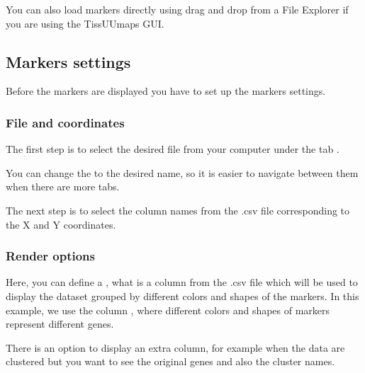 \documentclass[letterpaper,10pt,english,openany,oneside]{sphinxmanual}
\begin{document}
\sphinxAtStartPar
You can also load markers directly using drag and drop from a File Explorer if you are using the TissUUmaps GUI.


\subsection{Markers settings}
\label{\detokenize{docs/starting/markers:markers-settings}}
\sphinxAtStartPar
Before the markers are displayed you have to set up the markers settings.


\subsubsection{File and coordinates}
\label{\detokenize{docs/starting/markers:file-and-coordinates}}
\sphinxAtStartPar
The first step is to select the desired file from your computer under the tab .

\sphinxAtStartPar
{}

\sphinxAtStartPar
You can change the  to the desired name, so it is easier to navigate between them when there are more tabs.

\sphinxAtStartPar
{}

\sphinxAtStartPar
The next step is to select the column names from the .csv file corresponding to the X and Y coordinates.

\sphinxAtStartPar
{}


\subsubsection{Render options}
\label{\detokenize{docs/starting/markers:render-options}}
\sphinxAtStartPar
Here, you can define a , what is a column from the .csv file which will be used to display the dataset grouped by different colors and shapes of the markers. In this example, we use the column , where different colors and shapes of markers represent different genes.

\sphinxAtStartPar
{}

\sphinxAtStartPar
There is an option to display an extra column, for example when the data are clustered but you want to see the original genes and also the cluster names.
\end{document}
